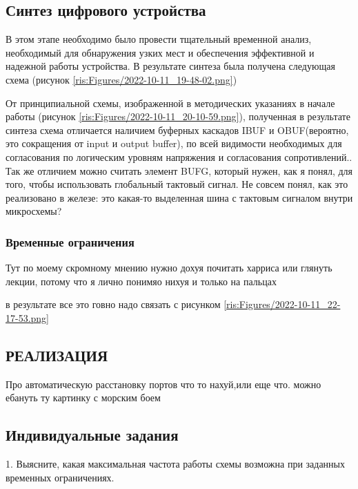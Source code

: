 \begin{sloppypar}
\subsection{Синтез цифрового устройства} %
В этом этапе необходимо было провести тщательный временной анализ, необходимый для обнаружения узких мест и обеспечения эффективной и надежной работы устройства. 
В результате синтеза была получена следующая схема (рисунок \ref{ris:Figures/2022-10-11_19-48-02.png})


От принципиальной схемы, изображенной в методических указаниях в начале работы (рисунок \ref{ris:Figures/2022-10-11_20-10-59.png}), полученная в результате синтеза схема отличается наличием буферных каскадов IBUF и OBUF(вероятно, это сокращения от input и output buffer), по всей видимости необходимых для согласования по логическим уровням напряжения и согласования сопротивлений.. Так же отличием можно считать элемент BUFG, который нужен, как я понял, для того, чтобы использовать глобальный тактовый сигнал. Не совсем понял, как это реализовано в железе: это какая-то выделенная шина с тактовым сигналом внутри микросхемы?


\subsubsection{Временные ограничения} %
Тут по моему скромному мнению нужно дохуя почитать харриса или глянуть лекции, потому что я лично понимяо нихуя и только на пальцах

в результате все это говно надо связать с рисунком \ref{ris:Figures/2022-10-11_22-17-53.png}



\newpage
\subsection{РЕАЛИЗАЦИЯ} %


Про автоматическую расстановку портов что то нахуй,или еще что. можно ебануть ту картинку с морским боем


\subsection{Индивидуальные задания}%
1. Выясните, какая максимальная частота работы схемы возможна при заданных временных ограничениях.



\end{sloppypar}
